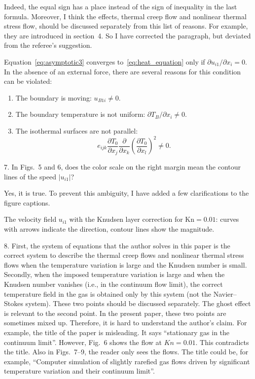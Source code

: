 \documentclass{article}
\newcommand{\Kn}{\mathrm{Kn}}
\newcommand{\pder}[2][]{\frac{\partial#1}{\partial#2}}
\newcommand{\Pder}[2][]{\partial#1/\partial#2}
\begin{document}
Indeed, the equal sign has a place instead of the sign of inequality in the last formula.
Moreover, I think the effects, thermal creep flow and nonlinear thermal stress flow, should
be discussed separately from this list of reasons. For example, they are introduced in section~4.
So I have corrected the paragraph, but deviated from the referee's suggestion.
\begin{leftbar}
Equation~\eqref{eq:asymptotic3} converges to~\eqref{eq:heat_equation} only if \(\Pder[u_{i1}]{x_i} = 0\).
In the absence of an external force, there are several reasons for this condition can be violated:
\begin{enumerate}
	\item The boundary is moving: \(u_{B1i} \neq 0 \).
	\item The boundary temperature is not uniform: \(\Pder[T_B]{x_i} \neq 0 \).
	\item The isothermal surfaces are not parallel:
		\begin{equation}\label{eq:equilibrium}
			e_{ijk}\pder[T_0]{x_j}\pder{x_k}\left(\pder[T_0]{x_l}\right)^2 \neq 0.
		\end{equation}
\end{enumerate}
\end{leftbar}

\begin{quoting}
7. In Figs.~5 and 6, does the color scale on the right margin mean the
contour lines of the speed \(|u_{i1}|\)?
\end{quoting}

Yes, it is true. To prevent this ambiguity, I have added a few clarifications to the figure captions.

\begin{leftbar}
The velocity field \(u_{i1}\) with the Knudsen layer correction for \(\Kn=0.01\):
curves with arrows indicate the direction, contour lines show the magnitude.
\end{leftbar}

\begin{quoting}
8. First, the system of equations that the author solves in this paper
is the correct system to describe the thermal creep flows and nonlinear
thermal stress flows when the temperature variation is large and the
Knudsen number is small. Secondly, when the imposed temperature
variation is large and when the Knudsen number vanishes (i.e., in the
continuum flow limit), the correct temperature field in the gas is
obtained only by this system (not the Navier--Stokes system). These two
points should be discussed separately. The ghost effect is relevant to
the second point. In the present paper, these two points are sometimes
mixed up. Therefore, it is hard to understand the author's claim. For
example, the title of the paper is misleading. It says ``stationary gas
in the continuum limit''. However, Fig.~6 shows the flow at \(Kn=0.01\).
This contradicts the title. Also in Figs.~7--9, the reader only sees the
flows. The title could be, for example, ``Computer simulation of
slightly rarefied gas flows driven by significant temperature variation
and their continuum limit''.
\end{quoting}
\end{document}
